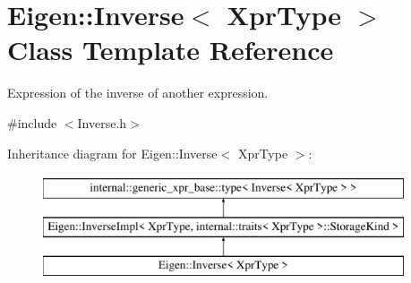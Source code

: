\hypertarget{class_eigen_1_1_inverse}{}\section{Eigen\+::Inverse$<$ Xpr\+Type $>$ Class Template Reference}
\label{class_eigen_1_1_inverse}


Expression of the inverse of another expression.  




{\ttfamily \#include $<$Inverse.\+h$>$}

Inheritance diagram for Eigen\+::Inverse$<$ Xpr\+Type $>$\+:\begin{figure}[H]
\begin{center}
\leavevmode
\includegraphics[height=3.000000cm]{class_eigen_1_1_inverse}
\end{center}
\end{figure}
